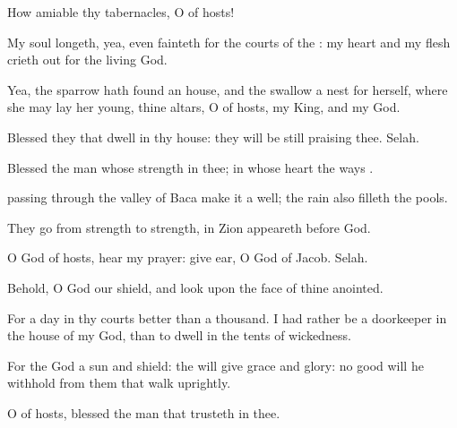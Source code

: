{\Q {}How
amiable
{} thy
tabernacles, O
{} of
hosts!


\par }{\Q {}My
soul
longeth, yea, even
fainteth for the
courts of the
{}: my
heart and my
flesh crieth
out for the
living
God.


\par }{\Q {}Yea, the
sparrow hath
found an
house, and the
swallow a
nest for herself, where she may
lay her
young,
{} thine
altars, O
{} of
hosts, my
King, and my
God.


\par }{\Q {}Blessed
{} they that
dwell in thy
house: they will be still
praising thee.
Selah.


\par }{\Q {}Blessed
{} the
man whose
strength
{} in thee; in whose
heart
{} the
ways
{}.


\par }{\Q {}
passing through the
valley of
Baca
make it a
well; the
rain also
filleth the
pools.


\par }{\Q {}They
go from
strength to
strength,
{} in
Zion
appeareth before
God.


\par }{\BB \par }
{\Q {}O
{}
God of
hosts,
hear my
prayer: give
ear, O
God of
Jacob.
Selah.


\par }{\Q {}Behold, O
God our
shield, and
look upon the
face of thine
anointed.


\par }{\Q {}For a
day in thy
courts
{}
better than a
thousand. I had
rather be a
doorkeeper in the
house of my
God, than to
dwell in the
tents of
wickedness.


\par }{\Q {}For the
{}
God
{} a
sun and
shield: the
{} will
give
grace and
glory: no
good
{} will he
withhold from them that
walk
uprightly.


\par }{\Q {}O
{} of
hosts,
blessed
{} the
man that
trusteth in thee.




\par }
